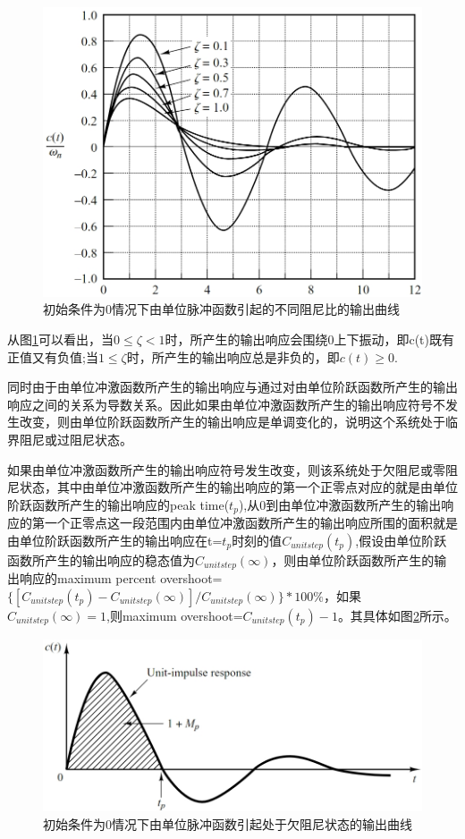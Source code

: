 \documentclass{article}
\numberwithin{equation}{section}
\numberwithin{figure}{section}
\begin{document}
\begin{figure}
    \centering
    \includegraphics[width=.6\textwidth]{Chapter5/2orderunitimpulseresponse.png} %
    \caption{初始条件为0情况下由单位脉冲函数引起的不同阻尼比的输出曲线} %
    \label{2orderunitimpulseresponse} %
\end{figure}

从图\ref{2orderunitimpulseresponse}可以看出，当$0≤\zeta<1$时，所产生的输出响应会围绕0上下振动，即c(t)既有正值又有负值;当$1≤\zeta$时，所产生的输出响应总是非负的，即$c(t)≥0$.


同时由于由单位冲激函数所产生的输出响应与通过对由单位阶跃函数所产生的输出响应之间的关系为导数关系。因此如果由单位冲激函数所产生的输出响应符号不发生改变，则由单位阶跃函数所产生的输出响应是单调变化的，说明这个系统处于临界阻尼或过阻尼状态。

如果由单位冲激函数所产生的输出响应符号发生改变，则该系统处于欠阻尼或零阻尼状态，其中由单位冲激函数所产生的输出响应的第一个正零点对应的就是由单位阶跃函数所产生的输出响应的peak time($t_p$),从0到由单位冲激函数所产生的输出响应的第一个正零点这一段范围内由单位冲激函数所产生的输出响应所围的面积就是由单位阶跃函数所产生的输出响应在t=$t_p$时刻的值$C_{unitstep}(t_p)$,假设由单位阶跃函数所产生的输出响应的稳态值为$C_{unitstep}(∞)$，则由单位阶跃函数所产生的输出响应的maximum percent overshoot=$\{[C_{unitstep}(t_p)-C_{unitstep}(∞)]/C_{unitstep}(∞)\}*100\%$，如果$C_{unitstep}(∞)=1$,则maximum overshoot=$C_{unitstep}(t_p)-1$。其具体如图\ref{2orderunitimpulseresponse2}所示。

\begin{figure}
    \centering
    \includegraphics[width=.6\textwidth]{Chapter5/2orderunitimpulseresponse2.png} %
    \caption{初始条件为0情况下由单位脉冲函数引起处于欠阻尼状态的输出曲线} %
    \label{2orderunitimpulseresponse2} %
\end{figure}
\end{document}

